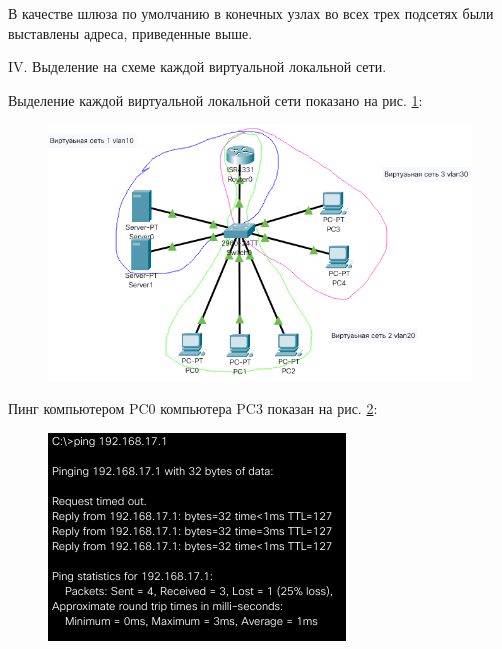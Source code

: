 \documentclass[a4paper,14pt]{extreport} %
\begin{document}
В качестве шлюза по умолчанию в конечных узлах во всех трех подсетях были выставлены адреса, приведенные выше.

IV. Выделение на схеме каждой виртуальной локальной сети.

Выделение каждой виртуальной локальной сети показано на рис. \ref{fig:4}:

\begin{figure}[H]
	\centering
	\includegraphics[width=1\linewidth]{4}
	\caption{}
	\label{fig:4}
\end{figure}

Пинг компьютером PC0 компьютера PC3 показан на рис. \ref{fig:5}:

\begin{figure}[H]
	\centering
	\includegraphics[width=0.7\linewidth]{5}
	\caption{}
	\label{fig:5}
\end{figure}
\end{document}
